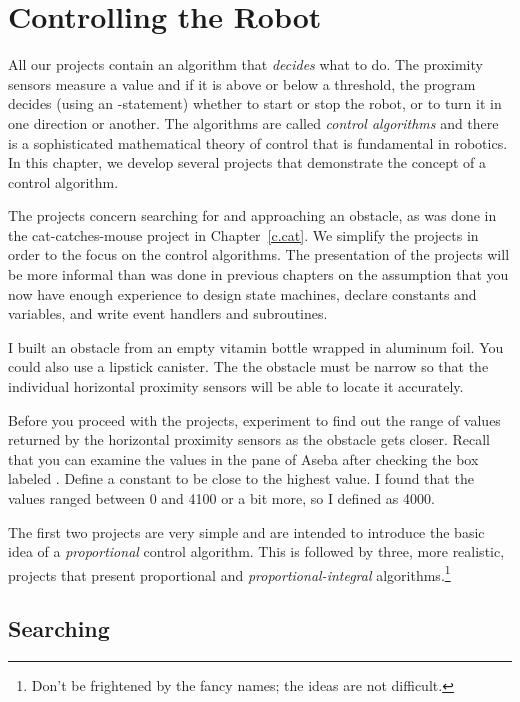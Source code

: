 \chapter{Controlling the Robot}

All our projects contain an algorithm that \emph{decides} what to do.
The proximity sensors measure a value and if it is above or below a
threshold, the program decides (using an -statement) whether to
start or stop the robot, or to turn it in one direction or another. The
algorithms are called \emph{control algorithms} and there is a
sophisticated mathematical theory of control that is fundamental in
robotics. In this chapter, we develop several projects that demonstrate
the concept of a control algorithm.

The projects concern searching for and approaching an obstacle, as was
done in the cat-catches-mouse project in Chapter~\ref{c.cat}. We
simplify the projects in order to the focus on the control algorithms.
The presentation of the projects will be more informal than was done in
previous chapters on the assumption that you now have enough experience
to design state machines, declare constants and variables, and write
event handlers and subroutines.

I built an obstacle from an empty vitamin bottle wrapped in aluminum
foil. You could also use a lipstick canister. The the obstacle must be
narrow so that the individual horizontal proximity sensors will be able
to locate it accurately.


Before you proceed with the projects, experiment to find out the range
of values returned by the horizontal proximity sensors as the obstacle
gets closer. Recall that you can examine the values in the
 pane of Aseba after checking the box labeled .
Define a constant  to be close to the highest value. I
found that the values ranged between 0 and 4100 or a bit more, so I
defined  as 4000.

The first two projects are very simple and are intended to introduce the
basic idea of a \emph{proportional} control algorithm. This is followed
by three, more realistic, projects that present proportional and
\emph{proportional-integral} algorithms.\footnote{Don't be frightened by
the fancy names; the ideas are not difficult.} 

\section{Searching}

